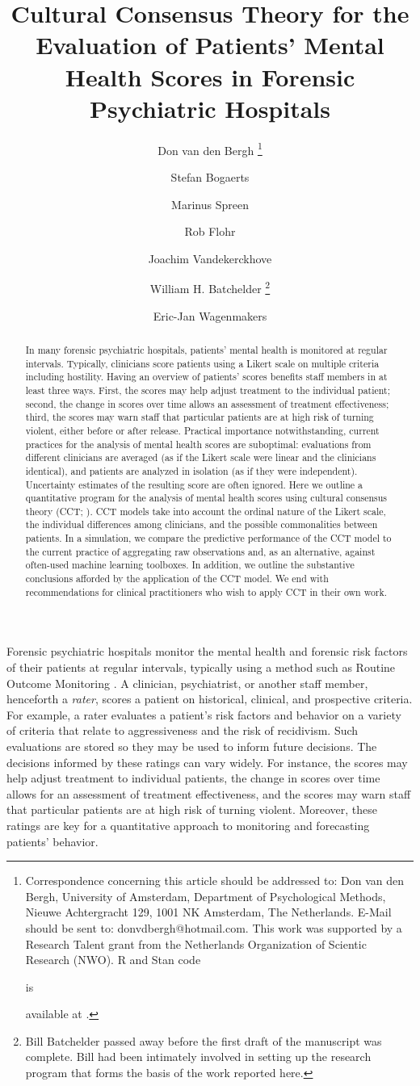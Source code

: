 \documentclass[a4paper,usenames,dvipsnames]{article}
\title{Cultural Consensus Theory for the Evaluation of Patients' Mental Health Scores in Forensic Psychiatric Hospitals}
\author[1]{Don van den Bergh%
\thanks{Correspondence concerning this article should be addressed to: Don van den Bergh, University of Amsterdam, Department of Psychological Methods, Nieuwe Achtergracht 129, 1001 NK Amsterdam, The Netherlands. E-Mail should be sent to: donvdbergh@hotmail.com. This work was supported by a Research Talent grant from the Netherlands Organization of Scientic Research (NWO). R and Stan code \begin{revision}is\end{revision} available at \osflink{}.
}}
\author[2]{Stefan Bogaerts}
\author[3]{Marinus Spreen}
\author[3]{\authorcr Rob Flohr}
\author[4]{Joachim Vandekerckhove}
\author[4]{\authorcr William H. Batchelder%
\thanks{Bill Batchelder passed away before the first draft of the manuscript was complete. Bill had been intimately involved in setting up the research program that forms the basis of the work reported here.}}
\author[1]{Eric-Jan Wagenmakers}
\affil[1]{University of Amsterdam}
\affil[2]{University of Tilburg}
\affil[3]{NHL Stenden University of Applied Sciences}
\affil[4]{University of California Irvine}
\date{}
\begin{document}
\maketitle

\begin{abstract}
In many forensic psychiatric hospitals, patients' mental health is monitored at regular intervals. Typically, clinicians score patients using a Likert scale on multiple criteria including hostility. Having an overview of patients’ scores benefits staff members in at least three ways. First, the scores may help adjust treatment to the individual patient; second, the change in scores over time allows an assessment of treatment effectiveness; third, the scores may warn staff that particular patients are at high risk of turning violent, either before or after release. Practical importance notwithstanding, current practices for the analysis of mental health scores are suboptimal: evaluations from different clinicians are averaged (as if the Likert scale were linear and the clinicians identical), and patients are analyzed in isolation (as if they were independent). Uncertainty estimates of the resulting score are often ignored. Here we outline a quantitative program for the analysis of mental health scores using cultural consensus theory (CCT; ). CCT models take into account the ordinal nature of the Likert scale, the individual differences among clinicians, and the possible commonalities between patients. In a simulation, we compare the predictive performance of the CCT model to the current practice of aggregating raw observations and, as an alternative, against often-used machine learning toolboxes. In addition, we outline the substantive conclusions afforded by the application of the CCT model. We end with recommendations for clinical practitioners who wish to apply CCT in their own work.
\end{abstract}
\newpage

Forensic psychiatric hospitals monitor the mental health and forensic risk factors of their patients at regular intervals, typically using a method such as Routine Outcome Monitoring \cite{deBeurs2011ROM}. A clinician, psychiatrist, or another staff member, henceforth a \textit{rater}, scores a patient on historical, clinical, and prospective criteria. For example, a rater evaluates a patient's risk factors and behavior on a variety of criteria that relate to aggressiveness and the risk of recidivism. Such evaluations are stored so they may be used to inform future decisions. The decisions informed by these ratings can vary widely. For instance, the scores may help adjust treatment to individual patients, the change in scores over time allows for an assessment of treatment effectiveness, and the scores may warn staff that particular patients are at high risk of turning violent. Moreover, these ratings are key for a quantitative approach to monitoring and forecasting patients' behavior.
\end{document}
